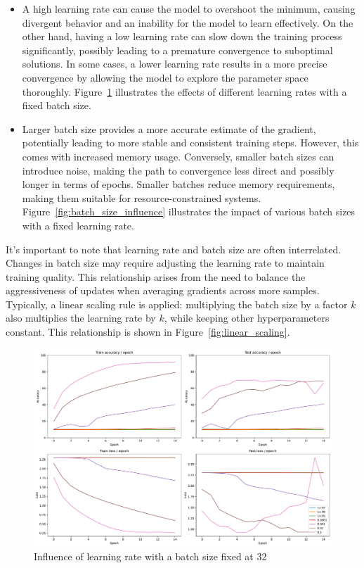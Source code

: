 \documentclass{article}
\theoremstyle{plain}%
\theoremstyle{definition}
\theoremstyle{remark}
\begin{document}
\begin{itemize}
    \item A high learning rate can cause the model to overshoot the minimum, causing divergent behavior and an inability for the model to learn effectively. On the other hand, having a low learning rate can slow down the training process significantly, possibly leading to a premature convergence to suboptimal solutions. In some cases, a lower learning rate results in a more precise convergence by allowing the model to explore the parameter space thoroughly. Figure~\ref{fig:learning_rate_influence} illustrates the effects of different learning rates with a fixed batch size.
    \item Larger batch size provides a more accurate estimate of the gradient, potentially leading to more stable and consistent training steps. However, this comes with increased memory usage. Conversely, smaller batch sizes can introduce noise, making the path to convergence less direct and possibly longer in terms of epochs. Smaller batches reduce memory requirements, making them suitable for resource-constrained systems. Figure~\ref{fig:batch_size_influence} illustrates the impact of various batch sizes with a fixed learning rate.

\end{itemize}

It's important to note that learning rate and batch size are often interrelated. Changes in batch size may require adjusting the learning rate to maintain training quality. This relationship arises from the need to balance the aggressiveness of updates when averaging gradients across more samples. Typically, a linear scaling rule is applied: multiplying the batch size by a factor $k$ also multiplies the learning rate by $k$, while keeping other hyperparameters constant. This relationship is shown in Figure~\ref{fig:linear_scaling}.

\begin{figure}[H]
    \centering
    \includegraphics*[width=\textwidth]{figs/CNN/learning_rate_influence.pdf}
    \caption{Influence of learning rate with a batch size fixed at 32}
    \label{fig:learning_rate_influence}
\end{figure}
\end{document}
